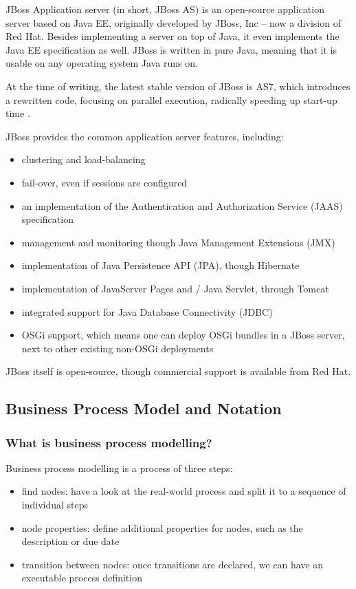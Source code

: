 JBoss Application server (in short, JBoss AS) is an open-source application server
based on Java EE, originally developed by JBoss, Inc -- now a division of Red
Hat. Besides implementing a server on top of Java, it even implements the Java
EE specification as well.  JBoss is written in pure Java, meaning that it is
usable on any operating system Java runs on.

At the time of writing, the latest stable version of JBoss is AS7, which
introduces a rewritten code, focusing on parallel execution, radically speeding
up start-up time \cite{jboss-fast}.

JBoss provides the common application server features, including:

\begin{itemize}
\item clustering and load-balancing
\item fail-over, even if sessions are configured
\item an implementation of the Authentication and Authorization Service (JAAS)
specification
\item management and monitoring though Java Management Extensions (JMX)
\item implementation of Java Persistence API (JPA), though Hibernate
\item implementation of JavaServer Pages and / Java Servlet, through Tomcat
\item integrated support for Java Database Connectivity (JDBC)
\item OSGi support, which means one can deploy OSGi bundles in a JBoss server,
next to other existing non-OSGi deployments
\end{itemize}

JBoss itself is open-source, though commercial support is available from Red Hat.

\subsection{Business Process Model and Notation}
\label{sec:bpmn}

\subsubsection*{What is business process modelling?}

Business process modelling is a process of three steps:

\begin{itemize}
\item find nodes: have a look at the real-world process and split it to a sequence of individual steps
\item node properties: define additional properties for nodes, such as the description or due date
\item transition between nodes: once transitions are declared, we can have an executable process definition
\end{itemize}

